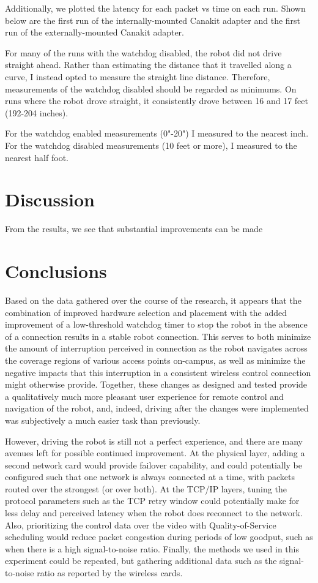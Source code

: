 \documentclass{IEEEtran}
\begin{document}
Additionally, we plotted the latency for each packet vs time on each run.
Shown below are the first run of the internally-mounted Canakit adapter
and the first run of the externally-mounted Canakit adapter.

For many of the runs with the watchdog disabled, the robot did not drive
straight ahead. Rather than estimating the distance that it travelled along
a curve, I instead opted to measure the straight line distance. Therefore,
measurements of the watchdog disabled should be regarded as minimums. On runs
where the robot drove straight, it consistently drove between 16 and 17 feet
(192-204 inches). 

For the watchdog enabled measurements (0"-20") I measured to the nearest inch.
For the watchdog disabled measurements (10 feet or more), I measured to the
nearest half foot.


\section{Discussion}
From the results, we see that substantial improvements can be made 


\section{Conclusions}
Based on the data gathered over the course of the research, it appears that
the combination of improved hardware selection and placement with the added
improvement of a low-threshold watchdog timer to stop the robot in the absence
of a connection results in a stable robot connection. This serves to both
minimize the amount of interruption perceived in connection as the robot
navigates across the coverage regions of various access points on-campus, as
well as minimize the negative impacts that this interruption in a consistent
wireless control connection might otherwise provide. Together, these changes
as designed and tested provide a qualitatively much more pleasant user
experience for remote control and navigation of the robot, and, indeed,
driving after the changes were implemented was subjectively a much easier task
than previously.

However, driving the robot is still not a perfect experience, and there are
many avenues left for possible continued improvement.
At the physical layer, adding a second
network card would provide failover capability, and could potentially be
configured such that one network is always connected at a time, with packets
routed over the strongest (or over both). At the TCP/IP layers, tuning the
protocol parameters such as the TCP retry window could potentially make for
less delay and perceived latency when the robot does reconnect to the network.
Also, prioritizing the control data over the video with Quality-of-Service
scheduling would reduce packet congestion during periods of low goodput, such
as when there is a high signal-to-noise ratio. Finally, the methods we used
in this experiment could be repeated, but gathering additional data such
as the signal-to-noise ratio as reported by the wireless cards.



\end{document}

